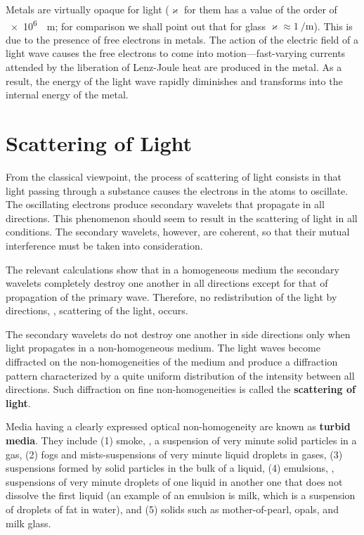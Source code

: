 Metals are virtually opaque for light ($\varkappa$ for them has a value of the order of \SI{e6}{\per\metre}; for comparison we shall point out that for glass $\varkappa\approx\SI{1}{\per\metre}$).
This is due to the presence of free electrons in metals.
The action of the electric field of a light wave causes the free electrons to come into motion---fast-varying currents attended by the liberation of Lenz-Joule heat are produced in the metal.
As a result, the energy of the light wave rapidly diminishes and transforms into the internal energy of the metal.

\section{Scattering of Light}\label{sec:20_5}

From the classical viewpoint, the process of scattering of light consists in that light passing through a substance causes the electrons
in the atoms to oscillate.
The oscillating electrons produce secondary wavelets that propagate in all directions.
This phenomenon should seem to result in the scattering of light in all conditions.
The secondary wavelets, however, are coherent, so that their mutual interference must be taken into consideration.

The relevant calculations show that in a homogeneous medium the secondary wavelets completely destroy one another in all directions except for that of propagation of the primary wave.
Therefore, no redistribution of the light by directions, \ie, scattering of the light, occurs.

The secondary wavelets do not destroy one another in side directions only when light propagates in a non-homogeneous medium.
The light waves become diffracted on the non-homogeneities of the medium and produce a diffraction pattern characterized by a quite uniform distribution of the intensity between all directions.
Such diffraction on fine non-homogeneities is called the \textbf{scattering of light}.

Media having a clearly expressed optical non-homogeneity are known as \textbf{turbid media}.
They include (1) smoke, \ie, a suspension of very minute solid particles in a gas, (2) fogs and mists-suspensions of very minute liquid droplets in gases, (3) suspensions formed by solid particles in the bulk of a liquid, (4) emulsions, \ie, suspensions of very minute droplets of one liquid in another one that does not dissolve the first liquid (an example of an emulsion is milk, which is a suspension of droplets of fat in water), and (5) solids such as mother-of-pearl, opals, and milk glass.

